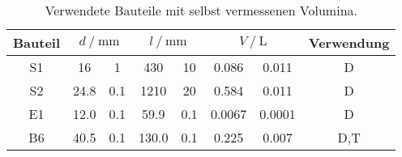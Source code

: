 \begin{table}
    \centering
    \caption{Verwendete Bauteile mit selbst vermessenen Volumina.}
    \label{tab:vol2}
    \begin{tabular}{c
                    S @{${}\pm{}$} S[table-format=1.1]
                    S[table-format=4.1] @{${}\pm{}$} S
                    S[table-format=1.4] @{${}\pm{}$} S[table-format=1.4]
                    c}
    \toprule
        {Bauteil} &
         &
         &
         &
        {Verwendung} \\
    \midrule
    S1 & 16 & 1 & 430 & 10 & 0.086 & 0.011 & D \\
    S2 & 24.8 & 0.1 & 1210 & 20 & 0.584 & 0.011 & D \\
    E1 & 12.0 & 0.1 & 59.9 & 0.1 & 0.0067 & 0.0001 & D \\
    B6 & 40.5 & 0.1 & 130.0 & 0.1 & 0.225 & 0.007 & D,T \\
    \end{tabular}
\end{table}
